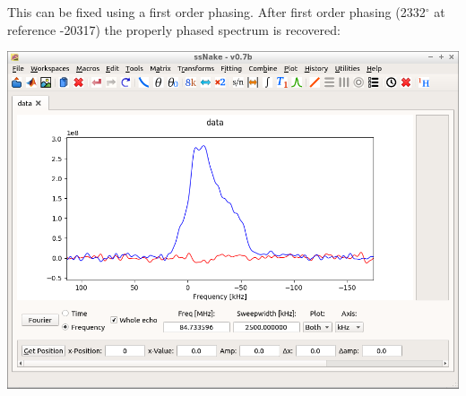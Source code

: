 \documentclass[11pt,a4paper]{article}
\begin{document}
This can be fixed using a first order phasing. After first order phasing (2332$^\circ$ at reference -20317) the properly phased spectrum is recovered:
\begin{center}
\includegraphics[width=0.8\linewidth]{Figs/Fig6.png}
\end{center}
\end{document}
